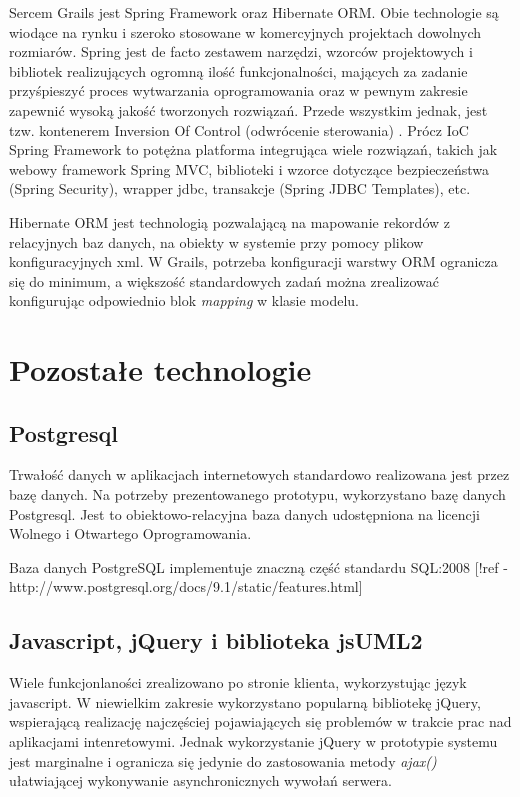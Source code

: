       Sercem Grails jest Spring Framework oraz Hibernate ORM. Obie technologie są wiodące na rynku i szeroko stosowane w komercyjnych projektach dowolnych rozmiarów. Spring jest de facto zestawem narzędzi, wzorców projektowych i bibliotek realizujących ogromną ilość funkcjonalności, mających za zadanie przyśpieszyć proces wytwarzania oprogramowania oraz w pewnym zakresie zapewnić wysoką jakość tworzonych rozwiązań. Przede wszystkim jednak, jest tzw. kontenerem Inversion Of Control (odwrócenie sterowania) \cite{MFow01}. Prócz IoC Spring Framework to potężna platforma integrująca wiele rozwiązań, takich jak webowy framework Spring MVC, biblioteki i wzorce dotyczące bezpieczeństwa (Spring Security), wrapper jdbc, transakcje (Spring JDBC Templates), etc.

      Hibernate ORM jest technologią pozwalającą na mapowanie rekordów z relacyjnych baz danych, na obiekty w systemie przy pomocy plikow konfiguracyjnych xml. W Grails, potrzeba konfiguracji warstwy ORM ogranicza się do minimum, a większość standardowych zadań można zrealizować konfigurując odpowiednio blok \emph{mapping} w klasie modelu.

  \section{Pozostałe technologie}
    \subsection{Postgresql}
      Trwałość danych w aplikacjach internetowych standardowo realizowana jest przez bazę danych. Na potrzeby prezentowanego prototypu, wykorzystano bazę danych Postgresql. Jest to obiektowo-relacyjna baza danych udostępniona na licencji Wolnego i Otwartego Oprogramowania. 

      Baza danych PostgreSQL implementuje znaczną część standardu SQL:2008 [!ref - http://www.postgresql.org/docs/9.1/static/features.html]

    \subsection{Javascript, jQuery i biblioteka jsUML2}

      Wiele funkcjonlaności zrealizowano po stronie klienta, wykorzystując język javascript. W niewielkim zakresie wykorzystano popularną bibliotekę jQuery, wspierającą realizację najczęściej pojawiających się problemów w trakcie prac nad aplikacjami intenretowymi. Jednak wykorzystanie jQuery w prototypie systemu jest marginalne i ogranicza się jedynie do zastosowania metody \emph{ajax()} ułatwiającej wykonywanie asynchronicznych wywołań serwera.

